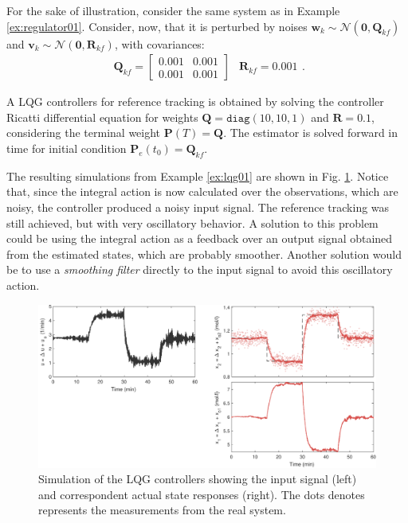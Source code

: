 \documentclass[a4paper,11pt]{book}
\numberwithin{figure}{chapter}
\numberwithin{equation}{chapter}
\numberwithin{table}{chapter}
\theoremstyle{definition}
\newtheorem{example}{Example}[chapter]
\newcounter{boxed-theorem}
\newcounter{boxed-lemma}
\newcounter{boxed-definition}
\newcounter{boxed-example}
\newenvironment{boxed-example}[1]
{\colorlet{shadecolor}{pastelRed!15} \begin{shaded} \begin{example}{#1}}
{\end{example} \end{shaded}}
\begin{document}
\begin{boxed-example}{} \label{ex:lqg01}
	For the sake of illustration, consider the same system as in Example \ref{ex:regulator01}. Consider, now, that it is perturbed by noises $\bm{w}_k \sim \mathcal{N}(\bm{0}, \bm{Q}_{kf})$ and $\bm{v}_k \sim \mathcal{N}(\bm{0}, \bm{R}_{kf})$, with covariances:
	\begin{equation}
		\begin{matrix}
			\bm{Q}_{kf} = \begin{bmatrix}
				0.001  &  0.001 \\
			    0.001  &  0.001
			\end{bmatrix} & \bm{R}_{kf} = 0.001
		\end{matrix}
	.\end{equation}
	
	\noindent A LQG controllers for reference tracking is obtained by solving the controller Ricatti differential equation for weights $\bm{Q} = \texttt{diag}(10, 10, 1)$ and $\bm{R} = 0.1$, considering the terminal weight $\bm{P}(T) = \bm{Q}$. The estimator is solved forward in time for initial condition $\bm{P}_e(t_0) = \bm{Q}_{kf}$. 
\end{boxed-example}

The resulting simulations from Example \ref{ex:lqg01} are shown in Fig. \ref{fig:lqg02}. Notice that, since the integral action is now calculated over the observations, which are noisy, the controller produced a noisy input signal. The reference tracking was still achieved, but with very oscillatory behavior. A solution to this problem could be using the integral action as a feedback over an output signal obtained from the estimated states, which are probably smoother. Another solution would be to use a \textit{smoothing filter} directly to the input signal to avoid this oscillatory action.

\begin{figure}[ht]
	\centering
	\includegraphics[width=\textwidth]{chapter4/report_ch4_1}
	\caption{Simulation of the LQG controllers showing the input signal (left) and correspondent actual state responses (right). The dots denotes represents the measurements from the real system.}
	\label{fig:lqg02}
\end{figure}
\end{document}
